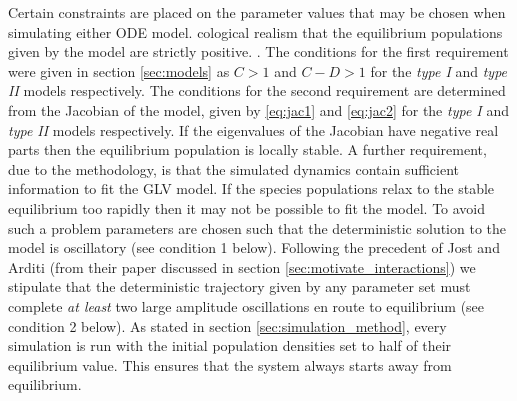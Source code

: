Certain constraints are placed on the parameter values that may be chosen when simulating either ODE model. cological realism  that the equilibrium populations given by the model are strictly positive. . The conditions for the first requirement were given in section \ref{sec:models} as $C>1$ and $C-D>1$ for the \emph{type I} and \emph{type II} models respectively. The conditions for the second requirement are determined from the Jacobian of the model, given by \eqref{eq:jac1} and \eqref{eq:jac2} for the \emph{type I} and \emph{type II} models respectively. If the eigenvalues of the Jacobian have negative real parts then the equilibrium population is locally stable. A further requirement, due to the methodology, is that the simulated dynamics contain sufficient information to fit the GLV model. If the species populations relax to the stable equilibrium too rapidly then it may not be possible to fit the model. To avoid such a problem parameters are chosen such that the deterministic solution to the model is oscillatory (see condition 1 below). Following the precedent of Jost and Arditi (from their paper \cite{jost2000identifying} discussed in section \ref{sec:motivate_interactions}) we stipulate that the deterministic trajectory given by any parameter set must complete \emph{at least} two large amplitude oscillations en route to equilibrium (see condition 2 below). As stated in section \ref{sec:simulation_method}, every simulation is run with the initial population densities set to half of their equilibrium value. This ensures that the system always starts away from equilibrium.

